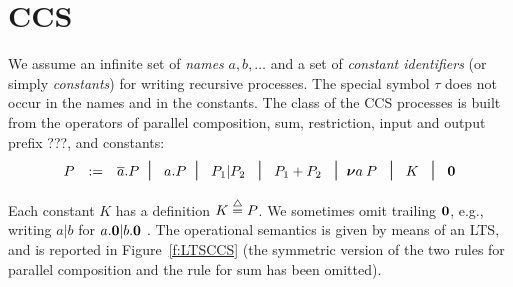 
\section{CCS}
\label{ss:ccs}


We assume  an infinite set  of \emph{names} $  a, b, \ldots $
 and   a  set  of
\emph{constant identifiers} (or simply \emph{constants}) 
 for writing recursive processes. 
The special symbol $\tau$ does not occur in the names and in the 
constants. 
The class   of the  CCS processes  is
built from the operators
of  parallel
composition,  sum,
 restriction, input and output prefix ???,  
and  constants:
$$ \begin{array}{ccl}
P  & := &    \outC a . P \midd \; a . P \midd \;  P_1 |  P_2 \; \midd  \;
P_1 + P_2 \; \midd %
  \res a P  \;  \midd \;   K  \;  \midd \; \nil  \\[\tkpS]
   \end{array}
 $$
Each constant $K$ has  a definition 
 $K \stackrel{\mbox{\scriptsize $\triangle$}}{=} P$.
We sometimes omit trailing ${\boldsymbol 0}$, e.g., writing $a|b$ for $a.{\boldsymbol 0} |b .{\boldsymbol 0} $ .
The operational semantics is given by means of an LTS, and is
reported in Figure~\ref{f:LTSCCS} (the symmetric version  of the two rules for
parallel composition and the rule for sum  has been omitted).

